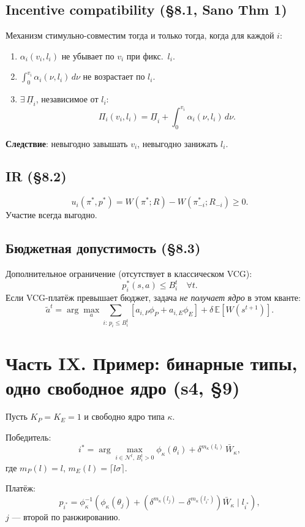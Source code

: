 \documentclass[11pt,a4paper]{article}
\begin{document}
\subsection{Incentive compatibility (§8.1, Sano Thm 1)}

Механизм стимульно-совместим тогда и только тогда, когда для каждой $i$:
\begin{enumerate}
  \item $\alpha_i(v_i,l_i)$ не убывает по $v_i$ при фикс.\ $l_i$.
  \item $\int_0^{v_i}\alpha_i(\nu,l_i)\,d\nu$ не возрастает по $l_i$.
  \item $\exists\,\underline\Pi_i$, независимое от $l_i$:
    \[
    \Pi_i(v_i,l_i) = \underline\Pi_i + \int_0^{v_i}\alpha_i(\nu,l_i)\,d\nu.
    \]
\end{enumerate}
\textbf{Следствие}: невыгодно завышать $v_i$, невыгодно занижать $l_i$.

\subsection{IR (§8.2)}

\[
u_i(\pi^*,p^*) = W(\pi^*;R) - W(\pi^*_{-i};R_{-i}) \geq 0.
\]
Участие всегда выгодно.

\subsection{Бюджетная допустимость (§8.3)}

Дополнительное ограничение (отсутствует в классическом VCG):
\[
p_i^*(s,a) \leq B_i^t \quad \forall t.
\]
Если VCG-платёж превышает бюджет, задача \emph{не получает ядро} в
этом кванте:
\[
\tilde a^t = \arg\max_a \sum_{i:\,p_i\leq B_i^t}
[a_{i,P}\phi_P+a_{i,E}\phi_E] + \delta\,\mathbb{E}[W(s^{t+1})].
\]

\section{Часть IX. Пример: бинарные типы, одно свободное ядро (s4, §9)}

Пусть $K_P=K_E=1$ и свободно ядро типа $\kappa$.

Победитель:
\[
i^* = \arg\max_{i\in\mathcal{N}^t,\,B_i^t>0}
\phi_\kappa(\theta_i) + \delta^{m_\kappa(l_i)}\,\bar W_\kappa,
\]
где $m_P(l)=l$, $m_E(l)=\lceil l\sigma\rceil$.

Платёж:
\[
p_{i^*} = \phi_\kappa^{-1}\!\left(
\phi_\kappa(\theta_j) + (\delta^{m_\kappa(l_j)}-\delta^{m_\kappa(l_{i^*})})\bar W_\kappa
\;\Big|\; l_{i^*}
\right),
\]
$j$ — второй по ранжированию.
\end{document}
